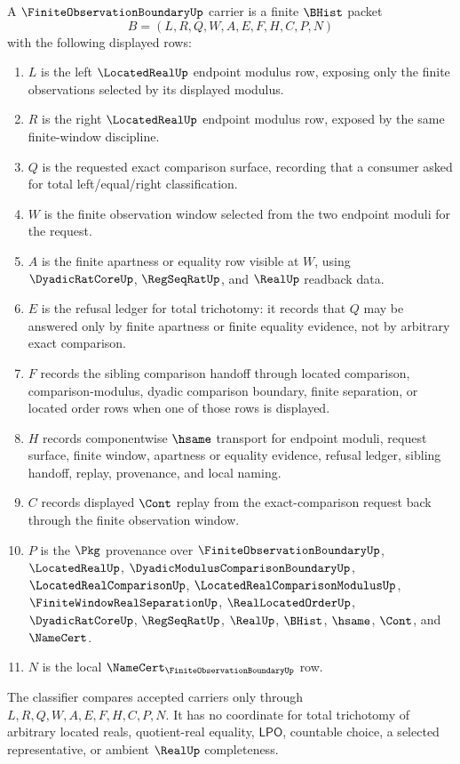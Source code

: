 \begin{definition}
\label{def:finite-observation-boundary-carrier}
A $\FiniteObservationBoundaryUp$ carrier is a finite $\BHist$ packet
$$
B=(L,R,Q,W,A,E,F,H,C,P,N)
$$
with the following displayed rows:
\begin{enumerate}
\item $L$ is the left $\LocatedRealUp$ endpoint modulus row, exposing only the finite observations selected by its displayed modulus.
\item $R$ is the right $\LocatedRealUp$ endpoint modulus row, exposed by the same finite-window discipline.
\item $Q$ is the requested exact comparison surface, recording that a consumer asked for total left/equal/right classification.
\item $W$ is the finite observation window selected from the two endpoint moduli for the request.
\item $A$ is the finite apartness or equality row visible at $W$, using $\DyadicRatCoreUp$, $\RegSeqRatUp$, and $\RealUp$ readback data.
\item $E$ is the refusal ledger for total trichotomy: it records that $Q$ may be answered only by finite apartness or finite equality evidence, not by arbitrary exact comparison.
\item $F$ records the sibling comparison handoff through located comparison, comparison-modulus, dyadic comparison boundary, finite separation, or located order rows when one of those rows is displayed.
\item $H$ records componentwise $\hsame$ transport for endpoint moduli, request surface, finite window, apartness or equality evidence, refusal ledger, sibling handoff, replay, provenance, and local naming.
\item $C$ records displayed $\Cont$ replay from the exact-comparison request back through the finite observation window.
\item $P$ is the $\Pkg$ provenance over $\FiniteObservationBoundaryUp$, $\LocatedRealUp$, $\DyadicModulusComparisonBoundaryUp$, $\LocatedRealComparisonUp$, $\LocatedRealComparisonModulusUp$, $\FiniteWindowRealSeparationUp$, $\RealLocatedOrderUp$, $\DyadicRatCoreUp$, $\RegSeqRatUp$, $\RealUp$, $\BHist$, $\hsame$, $\Cont$, and $\NameCert$.
\item $N$ is the local $\NameCert_{\FiniteObservationBoundaryUp}$ row.
\end{enumerate}
The classifier compares accepted carriers only through $L,R,Q,W,A,E,F,H,C,P,N$. It has no coordinate for total trichotomy of arbitrary located reals, quotient-real equality, $\mathsf{LPO}$, countable choice, a selected representative, or ambient $\RealUp$ completeness.
\end{definition}


